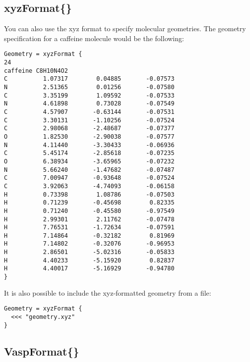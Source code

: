\subsection{xyzFormat\{\}}
\label{sec:dftbp.xyzFormat}

You can also use the xyz format to specify molecular geometries.
The geometry specification for a caffeine molecule would be the following:
\begin{verbatim}
Geometry = xyzFormat {
24
caffeine C8H10N4O2
C          1.07317        0.04885       -0.07573
N          2.51365        0.01256       -0.07580
C          3.35199        1.09592       -0.07533
N          4.61898        0.73028       -0.07549
C          4.57907       -0.63144       -0.07531
C          3.30131       -1.10256       -0.07524
C          2.98068       -2.48687       -0.07377
O          1.82530       -2.90038       -0.07577
N          4.11440       -3.30433       -0.06936
C          5.45174       -2.85618       -0.07235
O          6.38934       -3.65965       -0.07232
N          5.66240       -1.47682       -0.07487
C          7.00947       -0.93648       -0.07524
C          3.92063       -4.74093       -0.06158
H          0.73398        1.08786       -0.07503
H          0.71239       -0.45698        0.82335
H          0.71240       -0.45580       -0.97549
H          2.99301        2.11762       -0.07478
H          7.76531       -1.72634       -0.07591
H          7.14864       -0.32182        0.81969
H          7.14802       -0.32076       -0.96953
H          2.86501       -5.02316       -0.05833
H          4.40233       -5.15920        0.82837
H          4.40017       -5.16929       -0.94780
}
\end{verbatim}
It is also possible to include the xyz-formatted geometry from a file:
\begin{verbatim}
Geometry = xyzFormat {
  <<< "geometry.xyz"
}
\end{verbatim}

\subsection{VaspFormat\{\}}
\label{sec:dftbp.VaspFormat}


